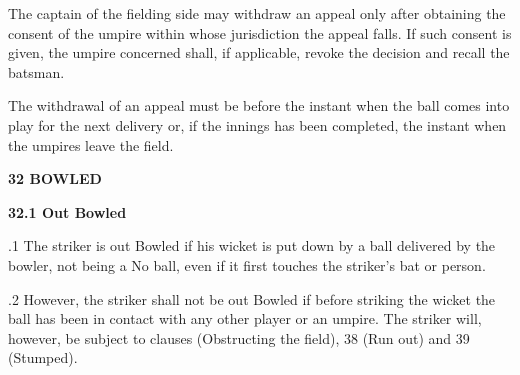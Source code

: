 \documentclass[12pt]{article}
\begin{document}
\vspace{\baselineskip}
\begin{adjustwidth}{0.0in}{0.14in}
{\fontsize{9pt}{10.8pt}\selectfont The captain of the fielding side may withdraw an appeal only after obtaining the consent of the umpire within whose jurisdiction the appeal falls. If such consent is given, the umpire concerned shall, if applicable, revoke the decision and recall the batsman.\par}\par

\end{adjustwidth}


\vspace{\baselineskip}
\begin{adjustwidth}{0.0in}{0.17in}
{\fontsize{9pt}{10.8pt}\selectfont The withdrawal of an appeal must be before the instant when the ball comes into play for the next delivery or, if the innings has been completed, the instant when the umpires leave the field.\par}\par

\end{adjustwidth}


\vspace{\baselineskip}
{\fontsize{16pt}{19.2pt}\selectfont \textbf{32 BOWLED}\par}\par


\vspace{\baselineskip}
{\fontsize{11pt}{13.2pt}\selectfont \textbf{32.1 \tabto{0.47in} Out Bowled}\par}\par


\vspace{\baselineskip}
\begin{adjustwidth}{0.5in}{0.01in}
\begin{justify}
{\fontsize{9pt}{10.8pt}.1 \tabto{0.49in} The striker is out Bowled if his wicket is put down by a ball delivered by the bowler, not being a No ball, even if it first touches the striker’s bat or person.\par}
\end{justify}\par

\end{adjustwidth}


\vspace{\baselineskip}
\begin{adjustwidth}{0.5in}{0.0in}
\begin{justify}
{\fontsize{9pt}{10.8pt}.2 \tabto{0.49in} However, the striker shall not be out Bowled if before striking the wicket the ball has been in contact with any other player or an umpire. The striker will, however, be subject to clauses (Obstructing the field), 38 (Run out) and 39 (Stumped).\par}
\end{justify}\par

\end{adjustwidth}
\end{document}
